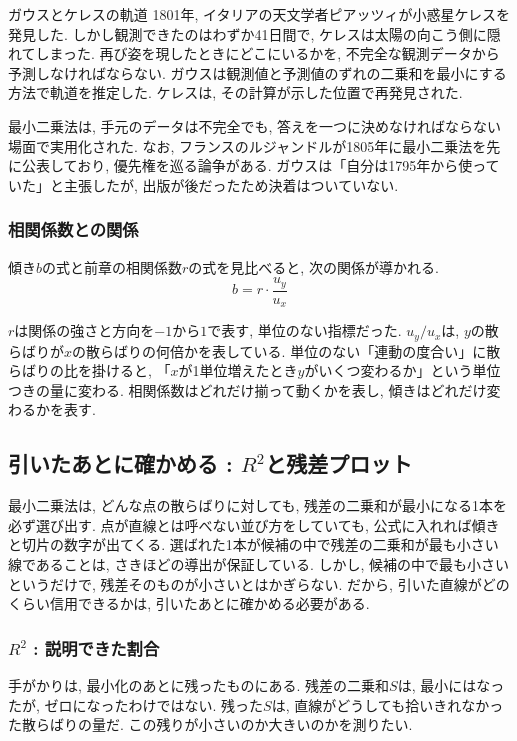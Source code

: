 \begin{mybox}{ガウスとケレスの軌道}
1801年, イタリアの天文学者ピアッツィが小惑星ケレスを発見した.
しかし観測できたのはわずか41日間で, ケレスは太陽の向こう側に隠れてしまった.
再び姿を現したときにどこにいるかを, 不完全な観測データから予測しなければならない.
ガウスは観測値と予測値のずれの二乗和を最小にする方法で軌道を推定した.
ケレスは, その計算が示した位置で再発見された.

最小二乗法は, 手元のデータは不完全でも, 答えを一つに決めなければならない場面で実用化された.
なお, フランスのルジャンドルが1805年に最小二乗法を先に公表しており, 優先権を巡る論争がある.
ガウスは「自分は1795年から使っていた」と主張したが, 出版が後だったため決着はついていない.
\end{mybox}


\subsubsection*{相関係数との関係}

傾き$b$の式と前章の相関係数$r$の式を見比べると, 次の関係が導かれる.
\[
  b = r \cdot \frac{u_y}{u_x}
\]

$r$は関係の強さと方向を$-1$から$1$で表す, 単位のない指標だった.
$u_y / u_x$は, $y$の散らばりが$x$の散らばりの何倍かを表している.
単位のない「連動の度合い」に散らばりの比を掛けると, 「$x$が1単位増えたとき$y$がいくつ変わるか」という単位つきの量に変わる.
相関係数はどれだけ揃って動くかを表し, 傾きはどれだけ変わるかを表す.


\subsection{引いたあとに確かめる : \texorpdfstring{$R^2$}{R²}と残差プロット}

最小二乗法は, どんな点の散らばりに対しても, 残差の二乗和が最小になる1本を必ず選び出す.
点が直線とは呼べない並び方をしていても, 公式に入れれば傾きと切片の数字が出てくる.
選ばれた1本が候補の中で残差の二乗和が最も小さい線であることは, さきほどの導出が保証している.
しかし, 候補の中で最も小さいというだけで, 残差そのものが小さいとはかぎらない.
だから, 引いた直線がどのくらい信用できるかは, 引いたあとに確かめる必要がある.

\subsubsection*{\texorpdfstring{$R^2$}{R²} : 説明できた割合}

手がかりは, 最小化のあとに残ったものにある.
残差の二乗和$S$は, 最小にはなったが, ゼロになったわけではない.
残った$S$は, 直線がどうしても拾いきれなかった散らばりの量だ.
この残りが小さいのか大きいのかを測りたい.

